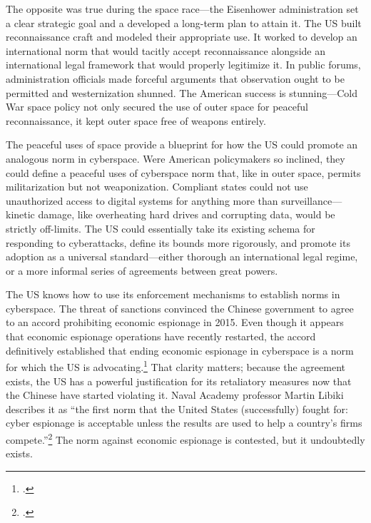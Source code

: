 \documentclass[11pt]{memoir}
\begin{document}
The opposite was true during the space race---the Eisenhower administration set a clear strategic goal and a developed a long-term plan to attain it. The US built reconnaissance craft and modeled their appropriate use. It worked to develop an international norm that would tacitly accept reconnaissance alongside an international legal framework that would properly legitimize it. In public forums, administration officials made forceful arguments that observation ought to be permitted and westernization shunned. The American success is stunning---Cold War space policy not only secured the use of outer space for peaceful reconnaissance, it kept outer space free of weapons entirely.

The peaceful uses of space provide a blueprint for how the US could promote an analogous norm in cyberspace. Were American policymakers so inclined, they could define a peaceful uses of cyberspace norm that, like in outer space, permits militarization but not weaponization. Compliant states could not use unauthorized access to digital systems for anything more than surveillance---kinetic damage, like overheating hard drives and corrupting data, would be strictly off-limits. The US could essentially take its existing schema for responding to cyberattacks, define its bounds more rigorously, and promote its adoption as a universal standard---either thorough an international legal regime, or a more informal series of agreements between great powers.

The US knows how to use its enforcement mechanisms to establish norms in cyberspace. The threat of sanctions convinced the Chinese government to agree to an accord prohibiting economic espionage in 2015. Even though it appears that economic espionage operations have recently restarted, the accord definitively established that ending economic espionage in cyberspace is a norm for which the US is advocating.\footcite{bartz_u.s._2018} That clarity matters; because the agreement exists, the US has a powerful justification for its retaliatory measures now that the Chinese have started violating it. Naval Academy professor Martin Libiki describes it as ``the first norm that the United States (successfully) fought for: cyber espionage is acceptable unless the results are used to help a country’s firms compete.''\footcite{libicki_coming_2017} The norm against economic espionage is contested, but it undoubtedly exists.
\end{document}
